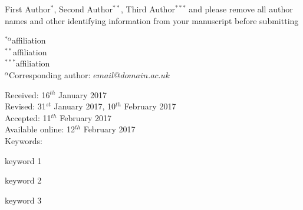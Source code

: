 \documentclass[paper=a4,fontsize=11pt,twocolumn]{article}
\begin{document}
		\large\textcolor{base-text-headings}{First Author$^{*}$, Second Author$^{**}$, Third Author$^{***}$ and please remove all author names and other identifying information from your manuscript before submitting}	

		\hspace{8mm}
				
		\setlength{\columnseprule}{1pt}
		\def\columnseprulecolor{\color{header-footer-title}}
		\begin{multicols}{2}
			\small\textcolor{base-text-headings}{$^{*\alpha}$affiliation\smallskip\\
				$^{**}$affiliation\smallskip\\
				$^{***}$affiliation}\bigskip\smallskip\\
			\vfill
			\small\textcolor{base-text-headings}{$^{\alpha}$Corresponding author: $email@domain.ac.uk$}
			\columnbreak

			\hangindent=0.8cm 
			\small\textcolor{base-text-headings}{
				\hspace{8mm}Received: 16$^{th}$ January 2017\smallskip\\
				Revised: 31$^{st}$ January 2017, 10$^{th}$ February 2017\smallskip\\
				Accepted: 11$^{th}$ February 2017\smallskip\\
				Available online: 12$^{th}$ February 2017\bigskip\\
				\vfill
				\hspace{8mm}Keywords: \colorbox{dark-grey-fill}{\strut keyword 1} \colorbox{dark-grey-fill}{\strut keyword 2} \colorbox{dark-grey-fill}{\strut keyword 3}
				}
		\end{multicols}
		\bigskip		
	
	\hspace{8mm}
\end{document}
